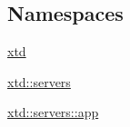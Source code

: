 \subsection*{Namespaces}
\begin{DoxyCompactItemize}
\item 
 \hyperlink{namespacextd}{xtd}
\item 
 \hyperlink{namespacextd_1_1servers}{xtd\+::servers}
\item 
 \hyperlink{namespacextd_1_1servers_1_1app}{xtd\+::servers\+::app}
\end{DoxyCompactItemize}
